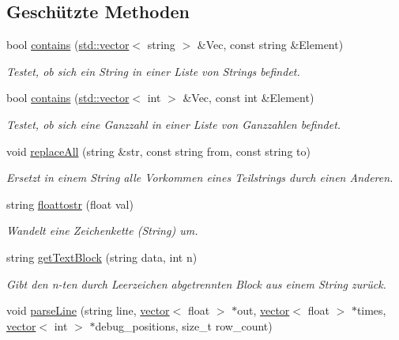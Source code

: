 \subsection*{Geschützte Methoden}
\begin{DoxyCompactItemize}
\item 
bool \hyperlink{classOdisiToSdConverter_ad851e258c9aad4ab07887fc19f9cc89d}{contains} (\hyperlink{classstd_1_1vector}{std\-::vector}$<$ string $>$ \&Vec, const string \&Element)
\begin{DoxyCompactList}\small\item\em Testet, ob sich ein String in einer Liste von Strings befindet. \end{DoxyCompactList}\item 
bool \hyperlink{classOdisiToSdConverter_a22b9cc047c31d81b84e74d68d69ba2c6}{contains} (\hyperlink{classstd_1_1vector}{std\-::vector}$<$ int $>$ \&Vec, const int \&Element)
\begin{DoxyCompactList}\small\item\em Testet, ob sich eine Ganzzahl in einer Liste von Ganzzahlen befindet. \end{DoxyCompactList}\item 
void \hyperlink{classOdisiToSdConverter_a8bf5e68acbe7e6388db98b1e1d321709}{replace\-All} (string \&str, const string from, const string to)
\begin{DoxyCompactList}\small\item\em Ersetzt in einem String alle Vorkommen eines Teilstrings durch einen Anderen. \end{DoxyCompactList}\item 
string \hyperlink{classOdisiToSdConverter_a01498491495ce740686843f6575859fd}{floattostr} (float val)
\begin{DoxyCompactList}\small\item\em Wandelt eine Zeichenkette (String) um. \end{DoxyCompactList}\item 
string \hyperlink{classOdisiToSdConverter_af7ff6a5280429bfa3ade6202e4651e25}{get\-Text\-Block} (string data, int n)
\begin{DoxyCompactList}\small\item\em Gibt den n-\/ten durch Leerzeichen abgetrennten Block aus einem String zurück. \end{DoxyCompactList}\item 
void \hyperlink{classOdisiToSdConverter_a0497baba5fd610c206b57a80154425b8}{parse\-Line} (string line, \hyperlink{classstd_1_1vector}{vector}$<$ float $>$ $\ast$out, \hyperlink{classstd_1_1vector}{vector}$<$ float $>$ $\ast$times, \hyperlink{classstd_1_1vector}{vector}$<$ int $>$ $\ast$debug\-\_\-positions, size\-\_\-t row\-\_\-count)

\end{DoxyCompactItemize}
